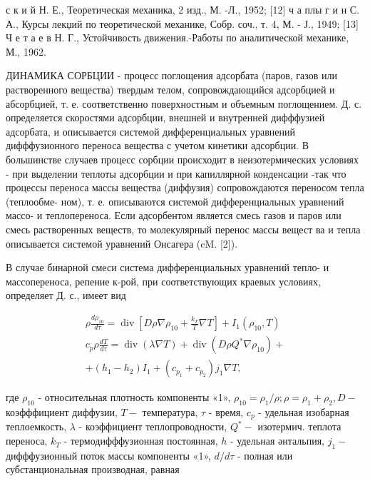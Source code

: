 \documentclass[10pt]{article}
\begin{document}
с к и й Н. Е., Теоретическая механика, 2 изд., М. -Л., 1952; [12] ч а плы г и н С. А., Курсы лекџий по теоретической механике, Собр. соч., т. 4, М. - Ј., 1949; [13] Ч е т а е в Н. Г., Устойчивость движения.-Работы по аналитической механике, М., 1962.



ДИНАМИКА СОРБЦИИ - процесс поглощения адсорбата (паров, газов или растворенного вещества) твердым телом, сопровождающийся адсорбцией и абсорбцией, т. е. соответственно поверхностным и объемным поглощением. Д. с. определяется скоростями адсорбции, внешней и внутренней дифффузией адсорбата, и описывается системой дифференциальных уравнений дифффузионного переноса вещества с учетом кинетики адсорбции. В большинстве случаев процесс сорбции происходит в неизотермических условиях - при выделении теплоты адсорбции и при капиллярной конденсации -так что процессы переноса массы вещества (диффузия) сопровождаются переносом тепла (теплообме- ном), т. е. описываются системой дифференциальных уравнений массо- и теплопереноса. Если адсорбентом является смесь газов и паров или смесь растворенных веществ, то молекулярный перенос массы вещест ва и тепла описывается системой уравнений Онсагера (cM. [2]).



В случае бинарной смеси система дифференциальных уравнений тепло- и массопереноса, репение к-рой, при соответствующих краевых условиях, определяет Д. с., имеет вид



\[

\begin{gathered}

\rho \frac{d \rho_{10}}{d \tau}=\operatorname{div}\left[D \rho \nabla \rho_{10}+\frac{k_{T}}{T} \nabla T\right]+I_{1}\left(\rho_{10}, T\right) \\

c_{p} \rho \frac{d T}{d \tau}=\operatorname{div}(\lambda \nabla T)+\operatorname{div}\left(D \rho Q^{*} \nabla \rho_{10}\right)+ \\

+\left(h_{1}-h_{2}\right) I_{1}+\left(c_{p_{1}}+c_{p_{2}}\right) j_{1} \nabla T,

\end{gathered}

\]



где $\rho_{10}$ - относительная плотность компоненты «1», $\rho_{10}=\rho_{1} / \rho ; \rho=\rho_{1}+\rho_{2}, D-$ коэфффициент диффузии, $T-$ температура, $\tau$ - время, $c_{p}$ - удельная изобарная теплоемкость, $\lambda$ - коэффициент теплопроводности, $Q^{*}-$ изотермич. теплота переноса, $k_{T}$ - термодифффузионная постоянная, $h$ - удельная әнтальпия, $j_{1}-$ дифффузионный поток массы компоненты «1», $d / d \tau$ - полная или субстанциональная производная, равная
\end{document}
